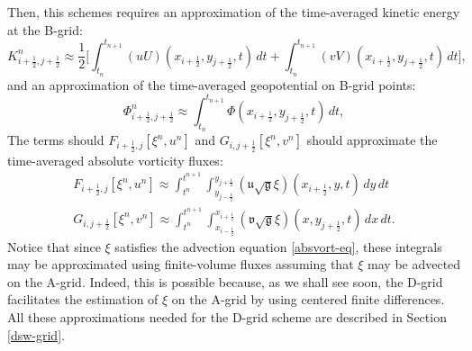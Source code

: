 Then, this schemes requires an approximation of the time-averaged kinetic energy at the B-grid:
\begin{equation}
	\label{ke-bgrid}
	K_{i+\frac{1}{2},j+\frac{1}{2}}^n \approx \frac{1}{2}\bigg[
	\int_{t_{n}}^{t_{n+1}} ({u}{U})(x_{i+\frac{1}{2}}, y_{j+\frac{1}{2}}, t) \,dt +
	\int_{t_{n}}^{t_{n+1}} ({v}{V})(x_{i+\frac{1}{2}}, y_{j+\frac{1}{2}}, t) \,dt\bigg],
\end{equation}
and an approximation of the time-averaged geopotential on B-grid points:
\begin{equation}
	\label{geop-bgrid}
	\Phi_{i+\frac{1}{2},j+\frac{1}{2}}^n \approx
	\int_{t_{n}}^{t_{n+1}} \Phi
	(x_{i+\frac{1}{2}}, y_{j+\frac{1}{2}}, t) \,dt,
\end{equation}
The terms should $F_{i+\frac{1}{2},j}[\xi^{n}, u^n]$ and $G_{i,j+\frac{1}{2}}[\xi^{n}, v^n] $ should approximate the time-averaged absolute vorticity fluxes:
\begin{align}
	F_{i+\frac{1}{2},j}[\xi^{n}, u^n] \approx
	\int_{t^n}^{t^{n+1}} 
	\int_{y_{j-\frac{1}{2}}}^{y_{j+\frac{1}{2}}} 
	{(\mathfrak{u}\sqrt{\mathfrak{g}}\xi)(x_{i+\frac{1}{2}}, y, t)}
	\,dy \,dt \\
	G_{i,j+\frac{1}{2}}[\xi^{n}, v^n] \approx
	\int_{t^n}^{t^{n+1}} 
    \int_{x_{i-\frac{1}{2}}}^{x_{i+\frac{1}{2}}} 
    {(\mathfrak{v}\sqrt{\mathfrak{g}}\xi)(x, y_{j+\frac{1}{2}}, t)}
    \,dx \,dt.
\end{align}
Notice that since $\xi$ satisfies the advection equation \eqref{absvort-eq}, 
these integrals may be approximated using finite-volume fluxes assuming that $\xi$ may be advected on the A-grid.
Indeed, this is possible because, as we shall see soon, the D-grid facilitates the estimation of $\xi$ on the A-grid by using centered finite differences.
All these approximations needed for the D-grid scheme are described in Section \ref{dsw-grid}.


